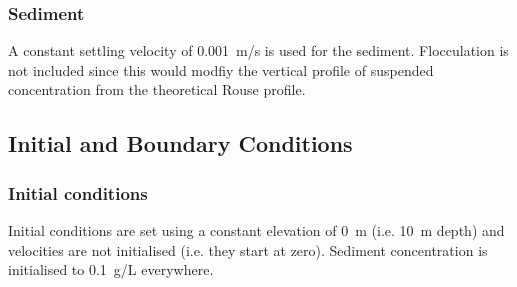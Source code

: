 \subsubsection{Sediment}
A constant settling velocity of 0.001~m/s is used for the sediment.
Flocculation is not included since this would modfiy the vertical
profile of suspended concentration from the theoretical Rouse profile.\\
%
%
%
%
%
%
\subsection{Initial and Boundary Conditions}
%
\subsubsection{Initial conditions}
%
Initial conditions are set using a constant elevation of 0~m (i.e. 10~m
depth) and velocities are not initialised (i.e. they start at zero).
Sediment concentration is initialised to 0.1~g/L everywhere.
%
